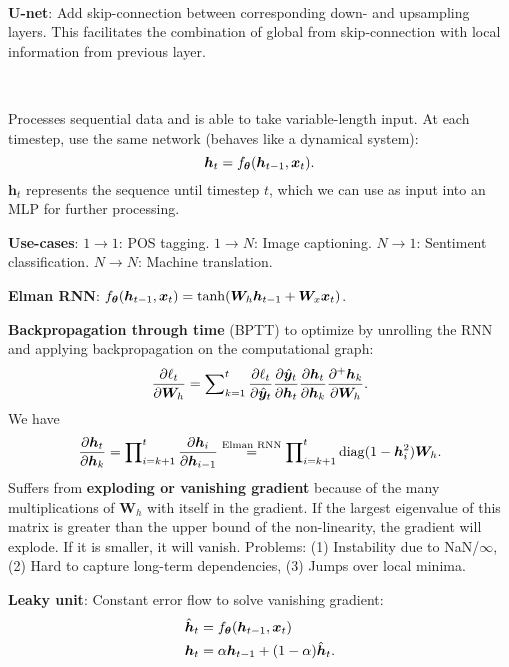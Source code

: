 \documentclass{article}
\newcommand{\lft}{\mathopen{}\mathclose\bgroup\left}
\newcommand{\rgt}{\aftergroup\egroup\right}
\renewcommand{\vec}[1]{\bm{#1}}
\newcommand{\mat}[1]{\bm{#1}}
\newenvironment{topic}[1]
{\textbf{\sffamily \colorbox{black}{\rlap{\textbf{\textcolor{white}{#1}}}\hspace{\linewidth}\hspace{-2\fboxsep}}} \\ \vspace{0.2cm}}
{}
\begin{document}
\begin{multicols*}{2}
\begin{topic}{Fully convolutional neural networks}
        \textbf{U-net}: Add skip-connection between corresponding down- and upsampling layers. This facilitates the
        combination of global from skip-connection with local information from previous layer.

    \end{topic}

    \begin{topic}{Recurrent neural networks}

        Processes sequential data and is able to take variable-length input. At each timestep, use the same
        network (behaves like a dynamical system): \[
            \vec{h}_t = f_{\vec{\theta}} \lft( \vec{h}_{t-1}, \vec{x}_t \rgt).
        \]
        $\vec{h}_t$ represents the sequence until timestep $t$, which we can use as input into an
        MLP for further processing.

        \textbf{Use-cases}: $1\to 1$: POS tagging. $1 \to N$: Image captioning. $N \to 1$: Sentiment
        classification. $N \to N$: Machine translation.

        \textbf{Elman RNN}: $f_{\vec{\theta}}(\vec{h}_{t-1}, \vec{x}_t) = \tanh \lft( \mat{W}_h \vec{h}_{t-1} + \mat{W}_x \vec{x}_t \rgt)$.

        \textbf{Backpropagation through time} (BPTT) to optimize by unrolling the RNN and applying backpropagation
        on the computational graph: \[
            \pdv{\ell_t}{\mat{W}_h} = \sum\nolimits_{k=1}^{t} \pdv{\ell_t}{\hat{\vec{y}}_t} \pdv{\hat{\vec{y}}_t}{\vec{h}_t} \pdv{\vec{h}_t}{\vec{h}_k} \pdv{^+ \vec{h}_k}{\mat{W}_h}.
        \]
        We have \[
            \pdv{\vec{h}_t}{\vec{h}_k} = \prod\nolimits_{i=k+1}^t \pdv{\vec{h}_i}{\vec{h}_{i-1}} \overset{\text{Elman RNN}}{=} \prod\nolimits_{i=k+1}^{t} \mathrm{diag}(1 - \vec{h}_i^2) \mat{W}_h.
        \]
        Suffers from \textbf{exploding or vanishing gradient} because of the many multiplications of
        $\mat{W}_h$ with itself in the gradient. If the largest eigenvalue of this matrix is greater than
        the upper bound of the non-linearity, the gradient will explode. If it is smaller, it will vanish.
        Problems: (1) Instability due to NaN/$\infty$, (2) Hard to capture long-term dependencies, (3)
        Jumps over local minima.

        \textbf{Leaky unit}: Constant error flow to solve vanishing gradient:
        \begin{align*}
            \hat{\vec{h}}_t & = f_{\vec{\theta}}\lft( \vec{h}_{t-1}, \vec{x}_t \rgt) \\
            \vec{h}_t       & = \alpha \vec{h}_{t-1} + (1-\alpha) \hat{\vec{h}}_t.
        \end{align*}


\end{topic}
\end{multicols*}
\end{document}
